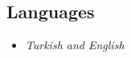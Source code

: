 \documentclass[margin, 10pt]{res} %
\begin{document}
\begin{resume}
\section{Languages}
\begin{itemize}
	\item{\sl Turkish and English}
\end{itemize}

\end{resume}
\end{document}
